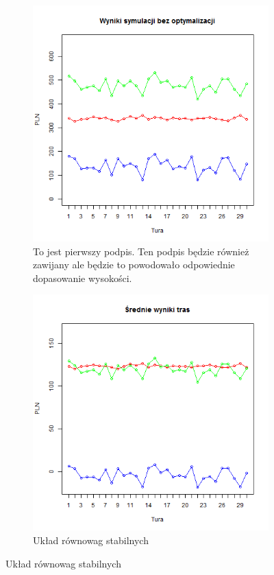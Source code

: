 \documentclass[polish, twoside, 12pt, a4paper]{article}
\theoremstyle{definition}
\theoremstyle{plain}
\theoremstyle{remark}
\begin{document}
\begin{figure}[hbt]
  \centering
  \begin{subfigure}[t]{0.45\textwidth}
    \includegraphics[width=\textwidth]{pictures/brak_algorytmu/wyniki.png}
    \caption{To jest pierwszy podpis. Ten podpis będzie również zawijany ale będzie to powodowało odpowiednie dopasowanie wysokości.}
    \label{fig:brak1}
  \end{subfigure}
  \hfill
  \begin{subfigure}[t]{0.45\textwidth}
    \includegraphics[width=\textwidth]{pictures/brak_algorytmu/trasy.png}
    \caption{Układ równowag stabilnych}
    \label{fig:brak2}
  \end{subfigure}
  

\end{figure}
\end{document}
